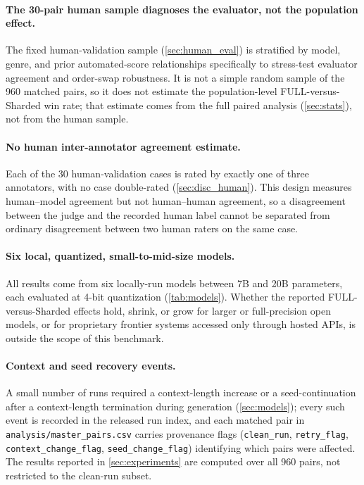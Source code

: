 \paragraph{The 30-pair human sample diagnoses the evaluator, not the population effect.} The fixed human-validation sample (\cref{sec:human_eval}) is stratified by model, genre, and prior automated-score relationships specifically to stress-test evaluator agreement and order-swap robustness. It is not a simple random sample of the 960 matched pairs, so it does not estimate the population-level FULL-versus-Sharded win rate; that estimate comes from the full paired analysis (\cref{sec:stats}), not from the human sample.

\paragraph{No human inter-annotator agreement estimate.} Each of the 30 human-validation cases is rated by exactly one of three annotators, with no case double-rated (\cref{sec:disc_human}). This design measures human--model agreement but not human--human agreement, so a disagreement between the judge and the recorded human label cannot be separated from ordinary disagreement between two human raters on the same case.

\paragraph{Six local, quantized, small-to-mid-size models.} All results come from six locally-run models between 7B and 20B parameters, each evaluated at 4-bit quantization (\cref{tab:models}). Whether the reported FULL-versus-Sharded effects hold, shrink, or grow for larger or full-precision open models, or for proprietary frontier systems accessed only through hosted APIs, is outside the scope of this benchmark.

\paragraph{Context and seed recovery events.} A small number of runs required a context-length increase or a seed-continuation after a context-length termination during generation (\cref{sec:models}); every such event is recorded in the released run index, and each matched pair in \texttt{analysis/master\_pairs.csv} carries provenance flags (\texttt{clean\_run}, \texttt{retry\_flag}, \texttt{context\_change\_flag}, \texttt{seed\_change\_flag}) identifying which pairs were affected. The results reported in \cref{sec:experiments} are computed over all 960 pairs, not restricted to the clean-run subset.

